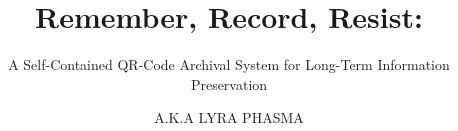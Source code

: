 \documentclass[12pt]{thesis} %
\title{Remember, Record, Resist:}     %
\subtitle{A Self-Contained QR-Code Archival System for Long-Term Information Preservation}
\author{A.K.A LYRA PHASMA}                           %
\begin{document}


\maketitle                  %


\begin{romanpages}          %
\tableofcontents            %
\listoffigures              %
\listoftables				%
\end{romanpages}            %

% 
% 







\appendix







\printbibliography

\appendix
\end{document}
